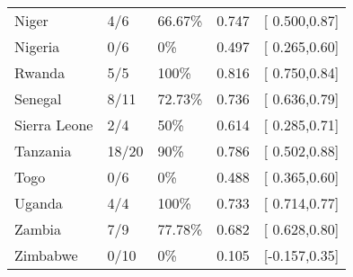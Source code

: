 \begin{table}[ht]
\begin{tabular}{lllrl}
  Niger & 4/6 & 66.67\% & 0.747 & [ 0.500,0.87] \\ 
  Nigeria & 0/6 & 0\% & 0.497 & [ 0.265,0.60] \\ 
  Rwanda & 5/5 & 100\% & 0.816 & [ 0.750,0.84] \\ 
  Senegal & 8/11 & 72.73\% & 0.736 & [ 0.636,0.79] \\ 
  Sierra Leone & 2/4 & 50\% & 0.614 & [ 0.285,0.71] \\ 
  Tanzania & 18/20 & 90\% & 0.786 & [ 0.502,0.88] \\ 
  Togo & 0/6 & 0\% & 0.488 & [ 0.365,0.60] \\ 
  Uganda & 4/4 & 100\% & 0.733 & [ 0.714,0.77] \\ 
  Zambia & 7/9 & 77.78\% & 0.682 & [ 0.628,0.80] \\ 
  Zimbabwe & 0/10 & 0\% & 0.105 & [-0.157,0.35] \\ 
   \hline
\end{tabular}
\end{table}
